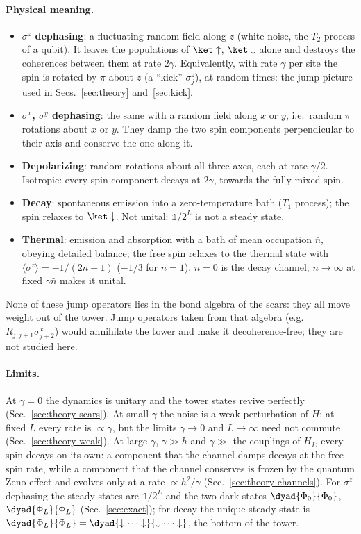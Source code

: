 \paragraph{Physical meaning.}
\begin{itemize}
\item \textbf{$\sigma^z$ dephasing}: a fluctuating random field along $z$ (white noise, the $T_2$ process of a qubit). It leaves the populations of $\ket\uparrow$, $\ket\downarrow$ alone and destroys the coherences between them at rate $2\gamma$. Equivalently, with rate $\gamma$ per site the spin is rotated by $\pi$ about $z$ (a ``kick'' $\sigma^z_j$), at random times: the jump picture used in Secs.~\ref{sec:theory} and~\ref{sec:kick}.
\item \textbf{$\sigma^x$, $\sigma^y$ dephasing}: the same with a random field along $x$ or $y$, i.e.\ random $\pi$ rotations about $x$ or $y$. They damp the two spin components perpendicular to their axis and conserve the one along it.
\item \textbf{Depolarizing}: random rotations about all three axes, each at rate $\gamma/2$. Isotropic: every spin component decays at $2\gamma$, towards the fully mixed spin.
\item \textbf{Decay}: spontaneous emission into a zero-temperature bath ($T_1$ process); the spin relaxes to $\ket\downarrow$. Not unital: $\mathds 1/2^L$ is not a steady state.
\item \textbf{Thermal}: emission and absorption with a bath of mean occupation $\bar n$, obeying detailed balance; the free spin relaxes to the thermal state with $\langle\sigma^z\rangle = -1/(2\bar n+1)$ ($-1/3$ for $\bar n = 1$). $\bar n = 0$ is the decay channel; $\bar n \to \infty$ at fixed $\gamma\bar n$ makes it unital.
\end{itemize}
None of these jump operators lies in the bond algebra of the scars: they all move weight out of the tower. Jump operators taken from that algebra (e.g.\ $R_{j,j+1}\sigma^x_{j+2}$) would annihilate the tower and make it decoherence-free; they are not studied here.

\paragraph{Limits.} At $\gamma = 0$ the dynamics is unitary and the tower states revive perfectly (Sec.~\ref{sec:theory-scars}). At small $\gamma$ the noise is a weak perturbation of $H$: at fixed $L$ every rate is $\propto\gamma$, but the limits $\gamma \to 0$ and $L \to \infty$ need not commute (Sec.~\ref{sec:theory-weak}). At large $\gamma$, $\gamma \gg h$ and $\gamma \gg$ the couplings of $H_I$, every spin decays on its own: a component that the channel damps decays at the free-spin rate, while a component that the channel conserves is frozen by the quantum Zeno effect and evolves only at a rate $\propto h^2/\gamma$ (Sec.~\ref{sec:theory-channels}). For $\sigma^z$ dephasing the steady states are $\mathds 1/2^L$ and the two dark states $\dyad{\Phi_0}{\Phi_0}$, $\dyad{\Phi_L}{\Phi_L}$ (Sec.~\ref{sec:exact}); for decay the unique steady state is $\dyad{\Phi_L}{\Phi_L} = \dyad{\downarrow\cdots\downarrow}{\downarrow\cdots\downarrow}$, the bottom of the tower.

